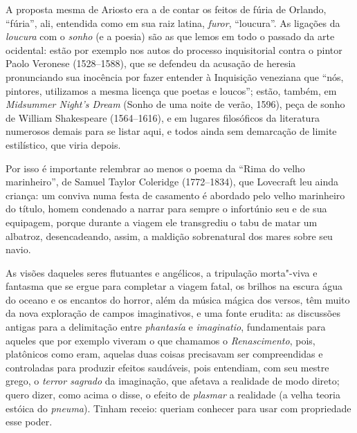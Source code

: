 A proposta mesma de Ariosto era a de contar os feitos de fúria de
Orlando, ``fúria'', ali, entendida como em sua raiz latina,
\emph{furor}, ``loucura''. As ligações da \emph{loucura} com o
\emph{sonho} (e a poesia) são as que lemos em todo o passado da arte
ocidental: estão por exemplo nos autos do processo inquisitorial contra
o pintor Paolo Veronese (1528--1588), que se defendeu da acusação de
heresia pronunciando sua inocência por fazer entender à Inquisição
veneziana que ``nós, pintores, utilizamos a mesma licença que poetas e
loucos''; estão, também, em \emph{Midsummer Night's Dream} (Sonho de uma
noite de verão, 1596), peça de sonho de William Shakespeare (1564--1616),
e em lugares filosóficos da literatura numerosos demais para se listar
aqui, e todos ainda sem demarcação de limite estilístico, que viria
depois.

Por isso é importante relembrar ao menos o poema da ``Rima do velho
marinheiro'', de Samuel Taylor Coleridge (1772--1834), que Lovecraft leu
ainda criança: um conviva numa festa de casamento é abordado pelo velho
marinheiro do título, homem condenado a narrar para sempre o infortúnio
seu e de sua equipagem, porque durante a viagem ele transgrediu o tabu
de matar um albatroz, desencadeando, assim, a maldição sobrenatural dos
mares sobre seu navio.

As visões daqueles seres flutuantes e angélicos, a tripulação morta"-viva
e fantasma que se ergue para completar a viagem fatal, os brilhos na
escura água do oceano e os encantos do horror, além da música mágica dos
versos, têm muito da nova exploração de campos imaginativos, e uma fonte
erudita: as discussões antigas para a delimitação entre \emph{phantasía}
e \emph{imaginatio}, fundamentais para aqueles que por exemplo viveram o
que chamamos o \emph{Renascimento}, pois, platônicos como eram, aquelas
duas coisas precisavam ser compreendidas e controladas para produzir
efeitos saudáveis, pois entendiam, com seu mestre grego, o \emph{terror
sagrado} da imaginação, que afetava a realidade de modo direto; quero
dizer, como acima o disse, o efeito de \emph{plasmar} a realidade (a
velha teoria estóica do \emph{pneuma}). Tinham receio: queriam conhecer
para usar com propriedade esse poder.

